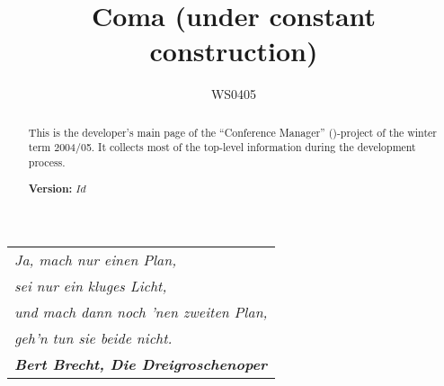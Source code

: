 \documentclass[11pt]{article}
\title{{\huge\bf Coma} (under constant construction)}
\author{WS0405}
\date{}
\begin{document}
\vspace{-2cm}





\maketitle{}



\begin{abstract}
  This is the developer's main page of the ``Conference Manager''
  (\Coma)-project of the winter term 2004/05. It collects most of the
  top-level information during the development process.

  \begin{center}
    \textbf{Version:} \texttt{$Id$}
  \end{center}
\end{abstract}




%



%



{\centering
  \begin{minipage}{10cm}
    \begin{tabular}[t]{l}
    \em
    Ja, mach nur einen Plan, 
    \\
    \emph{sei nur ein kluges Licht, }
    \\ 
    \emph{und mach dann noch 'nen zweiten Plan, }
    \\
    \emph{geh'n tun sie beide nicht.}
    \\
    \textbf{\em Bert Brecht, Die Dreigroschenoper}
\end{tabular}
  \end{minipage}}






%

%








%
%
\end{document}
